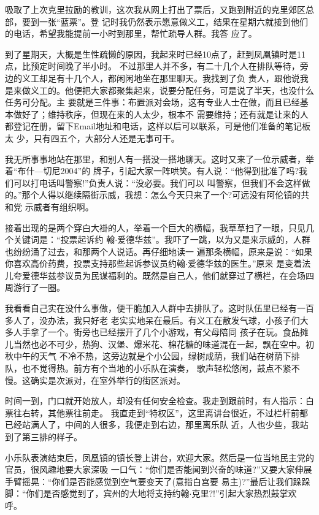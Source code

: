 ﻿\documentclass[11pt]{article}
\begin{document}
吸取了上次克里拉励的教训，这次我从网上打出了票后，又跑到附近的克里郊区总部，要到一张``蓝票''。登
记时我仍然表示愿意做义工，结果在星期六就接到他们的电话，希望我能提前一小时到那里，帮忙疏导人群。我答
应了。

到了星期天，大概是生性疏懒的原因，我起来时已经10点了，赶到凤凰镇时是11点，比预定时间晚了半小时。
不过那里人并不多，有二十几个人在排队等待，旁边的义工却足有十几个人，都闲闲地坐在那里聊天。我找到了负
责人，跟他说我是来做义工的。他便把大家都聚集起来，说要分配任务，可是说了半天，也没什么任务可分配。主
要就是三件事：布置派对会场，这有专业人士在做，而且已经基本做好了；维持秩序，但现在来的人太少，根本不
需要维持；还有就是让来的人都登记在册，留下Email地址和电话，这样以后可以联系，可是他们准备的笔记板太
少，只有四五个，大部分人还是无事可干。

我无所事事地站在那里，和别人有一搭没一搭地聊天。这时又来了一位示威者，举着``布什---切尼2004''的
牌子，引起大家一阵哄笑。有人说：``他得到批准了吗?我们可以打电话叫警察!''负责人说：``没必要。我们可以
叫警察，但我们不会这样做的。''那个人得以继续隔街示威，我想：怎么今天只来了一个?可远没有阿伦镇的共和党
示威者有组织啊。

接着出现的是两个穿白大褂的人，举着一个巨大的横幅，我草草扫了一眼，只见几个关键词是：``投票起诉约
翰$\cdot$爱德华兹''。我吓了一跳，以为又是来示威的，人群也纷纷涌了过去，和那两个人说话。再仔细地读一
遍那条横幅，原来是说：``如果你喜欢高价药费，投票支持那些起诉参议员约翰$\cdot$爱德华兹的医生。''原来
是变着法儿夸爱德华兹参议员为民谋福利的。既然是自己人，他们就穿过了横栏，在会场四周游行了一圈。

我看看自己实在没什么事做，便干脆加入人群中去排队了。这时队伍里已经有一百多人了，没办法，我只好老
老实实地呆在最后。有义工在散发气球，小孩子们大多人手拿了一个。街旁也已经摆开了几个小游戏，有父母陪同
孩子在玩。食品摊儿当然也必不可少，热狗、汉堡、爆米花、棉花糖的味道混在一起，飘在空中。初秋中午的天气
不冷不热，这旁边就是个小公园，绿树成荫，我们站在树荫下排队，也不觉得热。前方有个当地的小乐队在演奏，
歌声轻松悠闲，鼓点不紧不慢。这确实是次派对，在室外举行的街区派对。

时间一到，门口就开始放人，却没有任何安全检查。我走到跟前时，有人指示：白票往右转，其他票往前走。
我直走到``特权区''，这里离讲台很近，不过栏杆前都已经站满人了，中间的人很多，我便走到右边，那里离乐队
近，人也少些，我站到了第三排的样子。

小乐队表演结束后，凤凰镇的镇长登上讲台，欢迎大家。然后是一位当地民主党的官员，很风趣地要大家深吸
一口气：``你们是否能闻到兴奋的味道?''又要大家伸展手臂摇晃：``你们是否能感觉到空气要变天了(意指白宫要
易主)?''最后让我们跺跺脚：``你们是否感觉到了，宾州的大地将支持约翰$\cdot$克里?!''引起大家热烈鼓掌欢
呼。
\end{document}
